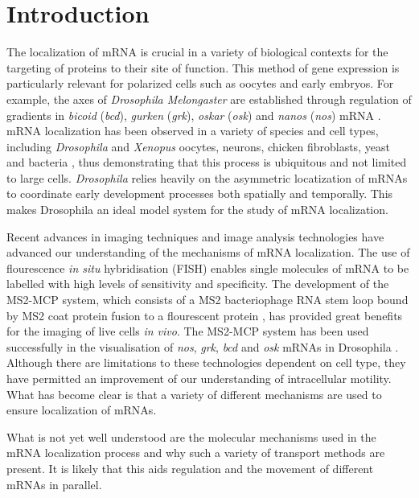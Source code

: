 \documentclass[twocolumn]{biophys}
\begin{document}
\section{Introduction}

The localization of mRNA is crucial in a variety of biological contexts for the targeting of proteins to their site of function.
This method of gene expression is particularly relevant for polarized cells such as oocytes and early embryos.
For example, the axes of \textit{Drosophila Melongaster} are established through regulation of gradients in \textit{bicoid} (\textit{bcd}), \textit{gurken} (\textit{grk}), \textit{oskar} (\textit{osk}) and \textit{nanos} (\textit{nos}) mRNA \citep{wolpert1998}.
mRNA localization has been observed in a variety of species and cell types, including \textit{Drosophila} and \textit{Xenopus} oocytes, neurons, chicken fibroblasts, yeast and bacteria \citep{wilkie2001drosophila, bobola1996asymmetric, mowry1992vegetal, rosbash1993rna, nevo2011translation}, thus demonstrating that this process is ubiquitous and not limited to large cells. 
\textit{Drosophila} relies heavily on the asymmetric locatization of mRNAs to coordinate early development processes both spatially and temporally.
This makes Drosophila an ideal model system for the study of mRNA localization.

Recent advances in imaging techniques and image analysis technologies \citep{jeffery1983localization, bertrand1998localization, hamilton2010particlestats} have advanced our understanding of the mechanisms of mRNA localization. 
The use of flourescence \textit{in situ} hybridisation (FISH) enables single molecules of mRNA to be labelled with high levels of sensitivity and specificity. 
The development of the MS2-MCP system, which consists of a MS2 bacteriophage RNA stem loop bound by MS2 coat protein fusion to a flourescent protein \citep{parton2014subcellular}, has provided great benefits for the imaging of live cells \textit{in vivo}.
The MS2-MCP system has been used successfully in the visualisation of \textit{nos}, \textit{grk}, \textit{bcd} and \textit{osk} mRNAs in Drosophila \citep{forrest2003live, jaramillo2008dynamics, weil2006localization, zimyanin2008vivo}.
Although there are limitations to these technologies dependent on cell type, they have permitted an improvement of our understanding of intracellular motility.
What has become clear is that a variety of different mechanisms are used to ensure localization of mRNAs.

What is not yet well understood are the molecular mechanisms used in the mRNA localization process and why such a variety of transport methods are present.
It is likely that this aids regulation and the movement of different mRNAs in parallel.
\end{document}

